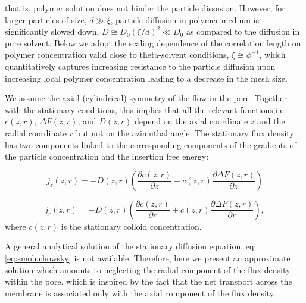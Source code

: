 \documentclass[12pt, a4paper]{article}
\begin{document}
that is, polymer solution does not hinder the particle dissusion. However, for larger particles of size, $d\gg \xi$, particle diffusion in polymer medium is significantly slowed down,
$D\cong D_0 (\xi/d)^2\ll D_0$ as compared to the diffusion in pure solvent. 
Below we adopt the scaling dependence of the correlation length on polymer concentration valid
close to theta-solvent conditions, $\xi\cong \phi^{-1}$, which quantitatively captures increasing resistance to the particle diffusion upon increasing local polymer concentration
leading to a decrease in the mesh size. 

We assume the axial (cylindrical) symmetry of the flow in the pore. Together with the stationary conditions, this implies that all the relevant functions,i.e. $c(z,r)$, $\Delta F(z,r)$, and $D(z,r)$ 
depend on the axial coordinate $z$ and the radial coordinate $r$ but not on the azimuthal angle.
The stationary flux density has two components linked to the corresponding components of the gradients of the particle concentration and the insertion free energy:

\begin{equation}
j_{z}(z,r)=-D(z,r)\left(\frac{\partial c(z,r)}{\partial z}+c(z,r)\frac{\partial\Delta F(z,r)}{\partial z}\right)\label{eq:flux_axial}
\end{equation}

\begin{equation}
j_{r}(z,r)=-D(z,r)\left(\frac{\partial c(z,r)}{\partial r}+c(z,r)\frac{\partial\Delta F(z,r)}{\partial r}\right),
\label{eq:flux_radial}
\end{equation}
\noindent where $c(z,r)$ is the stationary colloid concentration.

A general analytical solution of the stationary diffusion equation, eq \ref{eq:smoluchowsky} is not available. 
Therefore, here we present an approximate solution which amounts to neglecting the radial component of the flux density within the pore. 
which is inspired by the fact that the net transport across the membrane is associated only with the axial component of the flux density. 
\end{document}
